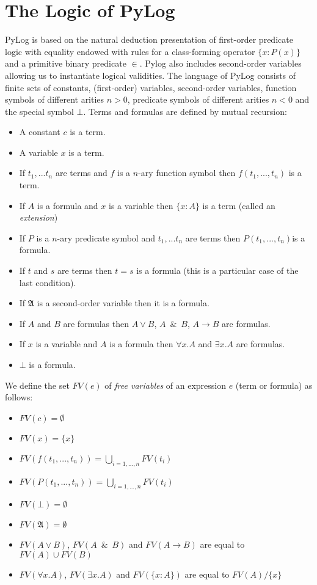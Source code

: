 \documentclass[12pt,leqno]{article}
\numberwithin{equation}{section}
\begin{document}
 
 
 \section*{The Logic of PyLog}
 
 PyLog is based on the natural deduction presentation of first-order predicate logic with equality endowed with rules for a class-forming operator $\{x: P(x)\}$ and a primitive binary predicate $\in$.
 Pylog also includes second-order variables  allowing  us to instantiate logical validities.
 The language of PyLog consists of finite sets of constants, (first-order) variables, second-order variables,  function symbols of different arities $n >0$, predicate symbols of different arities $n<0$ and the special symbol $\bot$.
 Terms and formulas are defined by mutual recursion:
 
 
 \begin{itemize}
 \item A constant $c$ is a term.
 \item A variable $x$ is a term.
 \item If $t_1,...t_n$ are terms and $f$ is a $n$-ary function symbol then $f(t_1,...,t_n)$ is a term.
 \item If $A$ is a formula and $x$ is a variable then $\{x : A\}$ is a term (called an \emph{extension})
 \item If $P$ is a $n$-ary predicate symbol and $t_1,...t_n$ are terms then $P(t_1,...,t_n)$is a formula.
 \item If $t$ and $s$ are terms then $t=s$ is a formula (this is a particular case of the last condition).
 \item If $\mathfrak{A}$ is a second-order variable then it is a formula.
 \item If $A$ and $B$ are formulas then $A\vee B$, $A\enspace \&\enspace B$, $A\rightarrow B$ are formulas.
 \item If $x$ is a variable and $A$ is a formula then $\forall x.A$ and $\exists x.A$ are formulas.
 \item $\bot$ is a formula.
 \end{itemize}


We define the set $FV(e)$ of \emph{free variables} of an expression $e$ (term or formula) as follows:


\begin{itemize}
	\item $FV(c) = \emptyset$
	\item $FV(x) = \{x\}$
	\item $FV(f(t_1,...,t_n)) = \bigcup_{i=1,...,n} FV(t_i)$
		\item $FV(P(t_1,...,t_n)) = \bigcup_{i=1,...,n} FV(t_i)$
	\item $FV(\bot) = \emptyset$
	\item $FV(\mathfrak{A}) = \emptyset$
	\item $FV(A\vee B)$, $FV(A\enspace\&\enspace B)$ and  $FV(A\rightarrow B)$ are equal to $FV(A) \cup FV(B)$
   \item $FV(\forall x.A)$, $FV(\exists x.A)$ and $FV(\{x: A\})$ are equal to $FV(A)/\{x\}$ 
\end{itemize}
\end{document}

